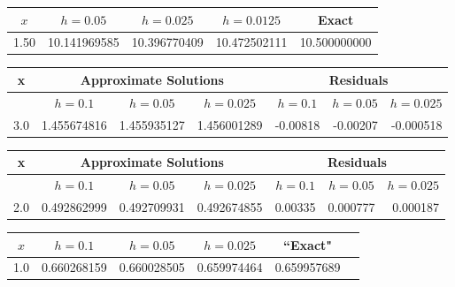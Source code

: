 \bigskip

{\small
{}
\begin{tabular}{|c|r|r|r|r|}\hline
\multicolumn{1}{|c|}{$x$}&
\multicolumn{1}{|c|}{$h=0.05$}&
\multicolumn{1}{|c|}{$h=0.025$}&
\multicolumn{1}{|c|}{$h=0.0125$}&
\multicolumn{1}{|c|}{Exact}\\ \hline
1.50 &10.141969585  & 10.396770409 & 10.472502111 & 10.500000000 \\
\hline
\end{tabular}}

\bigskip

{\small
{}
\begin{tabular}{|c|r|r|r|r|r|r|}\hline
x&\multicolumn{3}{c|}{Approximate Solutions}&
\multicolumn{3}{c|}{Residuals}\\\hline
&
\multicolumn{1}{|c|}{$h=0.1$}&
\multicolumn{1}{|c|}{$h=0.05$}&
\multicolumn{1}{|c|}{$h=0.025$}&
\multicolumn{1}{|c|}{$h=0.1$}&
\multicolumn{1}{|c|}{$h=0.05$}&
\multicolumn{1}{|c|}{$h=0.025$}\\ \hline
3.0 & 1.455674816 & 1.455935127 &1.456001289  &-0.00818  & -0.00207 & -0.000518  \\
\hline
\end{tabular}}

\bigskip

{\small
{}
\begin{tabular}{|c|r|r|r|r|r|r|}\hline
x&\multicolumn{3}{c|}{Approximate Solutions}&
\multicolumn{3}{c|}{Residuals}\\\hline
&\multicolumn{1}{|c|}{$h=0.1$}&
\multicolumn{1}{|c|}{$h=0.05$}&
\multicolumn{1}{|c|}{$h=0.025$}&
\multicolumn{1}{|c|}{$h=0.1$}&
\multicolumn{1}{|c|}{$h=0.05$}&
\multicolumn{1}{|c|}{$h=0.025$}\\ \hline
2.0 & 0.492862999 & 0.492709931 & 0.492674855 &0.00335 & 0.000777 &  0.000187  \\
\hline
\end{tabular}}

\bigskip

{\small
{}
\begin{tabular}{|c|r|r|r|r|r|}
\hline
\multicolumn{1}{|c|}{$x$}&
\multicolumn{1}{|c|}{$h=0.1$}&
\multicolumn{1}{|c|}{$h=0.05$}&
\multicolumn{1}{|c|}{$h=0.025$}&
\multicolumn{1}{|c|}{``Exact"}\\ \hline
1.0 & 0.660268159 & 0.660028505 & 0.659974464 & 0.659957689 \\
\hline
\end{tabular}}

